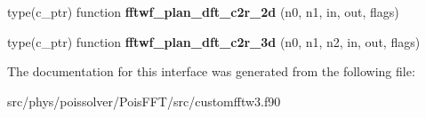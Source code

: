 \begin{DoxyCompactItemize}
\item 
type(c\+\_\+ptr) function {\bfseries fftwf\+\_\+plan\+\_\+dft\+\_\+c2r\+\_\+2d} (n0, n1, in, out, flags)\hypertarget{interfacefftw3_1_1fftw__plan__gen_a3ae341c0c6c4af90468d4c4da6239bcb}{}\label{interfacefftw3_1_1fftw__plan__gen_a3ae341c0c6c4af90468d4c4da6239bcb}

\item 
type(c\+\_\+ptr) function {\bfseries fftwf\+\_\+plan\+\_\+dft\+\_\+c2r\+\_\+3d} (n0, n1, n2, in, out, flags)\hypertarget{interfacefftw3_1_1fftw__plan__gen_a9380d0fb7d8b0c1f4e5a2de822fc6bc7}{}\label{interfacefftw3_1_1fftw__plan__gen_a9380d0fb7d8b0c1f4e5a2de822fc6bc7}

\end{DoxyCompactItemize}


The documentation for this interface was generated from the following file\+:\begin{DoxyCompactItemize}
\item 
src/phys/poissolver/\+Pois\+F\+F\+T/src/customfftw3.\+f90\end{DoxyCompactItemize}
